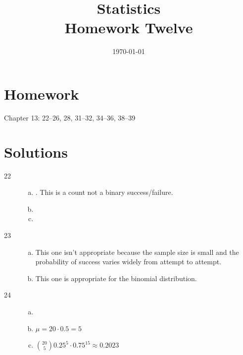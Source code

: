 \documentclass[letterpaper, landscape]{exam}
\title{Statistics \\ Homework Twelve}
\date{\today}
\author{}
\begin{document}
  \maketitle

  \section{Homework}

  Chapter 13: 22--26, 28, 31--32, 34--36, 38--39

  \ifprintanswers{}
    \section{Solutions}
    \begin{description}

      \item[22] 
        \begin{enumerate}[(a)]
          \item {}. This is a count not a binary
            success/failure.

          \item {}

          \item {}
        \end{enumerate}

      \item[23]
        \begin{enumerate}[(a)]
          \item This one isn't appropriate because the sample size is small and
            the probability of success varies widely from attempt to attempt.

          \item This one is appropriate for the binomial distribution.
        \end{enumerate}

      \item[24]
        \begin{enumerate}[(a)]
          \item {}

          \item $\mu = 20 \cdot 0.5 = \boxed{ 5 }$

          \item $ \binom{20}{5} 0.25^5 \cdot 0.75^{15} \approx \boxed{ 0.2023 } $
        \end{enumerate}


\end{description}
\end{document}
